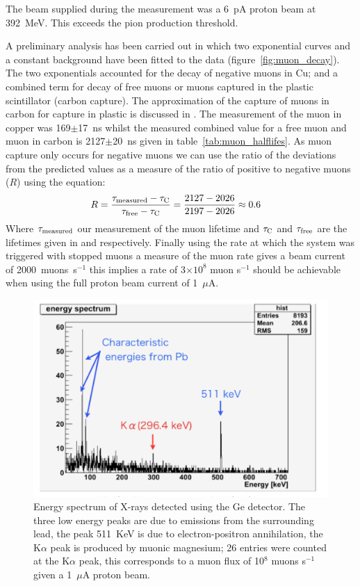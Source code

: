 \documentclass[a4paper]{jpconf}
\begin{document}
The beam supplied during the measurement was a 6~pA proton beam at 392~MeV. This exceeds the pion production threshold.

A preliminary analysis has been carried out in which two exponential curves and a constant background have been fitted to the data (figure~\ref{fig:muon_decay}). The two exponentials accounted for the decay of negative muons in Cu; and a combined term for decay of free muons or muons captured in the plastic scintillator (carbon capture). The approximation of the capture of muons in carbon for capture in plastic is discussed in \cite{Suzuki1987muonCapture}. The measurement of the muon in copper was 169$\pm$17~ns whilst the measured combined value for a free muon and muon in carbon is 2127$\pm$20~ns given in table~\ref{tab:muon_halflifes}. As muon capture only occurs for negative muons we can use the ratio of the deviations from the predicted values as a measure of the ratio of positive to negative muons ($R$) using the equation:
\begin{eqnarray}
    R &= \frac{\tau_{\rm{measured}} - \tau_{\rm{C}}}{\tau_{\rm{free}} - \tau_{\rm{C}} } = \frac{2127 - 2026}{2197-2026} \approx 0.6  \label{equ:ratio_pos_neg}
\end{eqnarray}
Where $\tau_{\rm{measured}}$ our measurement of the muon lifetime and $\tau_{\rm{C}}$ and $\tau_{\rm{free}}$ are the lifetimes given in \cite{Suzuki1987muonCapture} and \cite{Pdg2010} respectively. Finally using the rate at which the system was triggered with stopped muons a measure of the muon rate gives a beam current of 2000~muons~s$^{-1}$ this implies a rate of 3$\times 10^8$ muon s$^{-1}$ should be achievable when using the full proton beam current of 1~$\mu$A. 

\begin{figure}[htbp]
    \centering
        \includegraphics[height=7.5cm]{images/muonic_xray_spectrum.png}
    \caption{Energy spectrum of X-rays detected using the Ge detector. The three low energy peaks are due to emissions from the surrounding lead, the peak 511~KeV is due to electron-positron annihilation, the K$\alpha$ peak is produced by muonic magnesium; 26 entries were counted at the K$\alpha$ peak, this corresponds to a muon flux of 10$^8$ muons s$^{-1}$ given a 1~$\mu$A proton beam.}
    \label{fig:muonic_xray_spectrum}
\end{figure}
\end{document}
